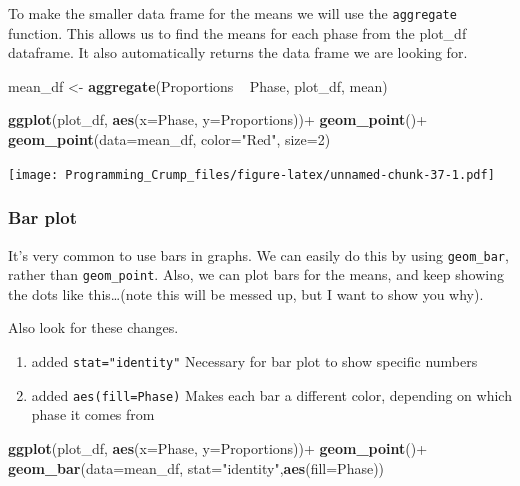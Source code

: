 \documentclass[]{book}
\newenvironment{Shaded}{\begin{snugshade}}{\end{snugshade}}
\newcommand{\KeywordTok}[1]{\textcolor[rgb]{0.13,0.29,0.53}{\textbf{{#1}}}}
\newcommand{\DataTypeTok}[1]{\textcolor[rgb]{0.13,0.29,0.53}{{#1}}}
\newcommand{\DecValTok}[1]{\textcolor[rgb]{0.00,0.00,0.81}{{#1}}}
\newcommand{\StringTok}[1]{\textcolor[rgb]{0.31,0.60,0.02}{{#1}}}
\newcommand{\NormalTok}[1]{{#1}}
\providecommand{\tightlist}{%
  \setlength{\itemsep}{0pt}\setlength{\parskip}{0pt}}
\theoremstyle{definition}
\theoremstyle{definition}
\theoremstyle{definition}
\theoremstyle{remark}
\begin{document}
To make the smaller data frame for the means we will use the
\texttt{aggregate} function. This allows us to find the means for each
phase from the plot\_df dataframe. It also automatically returns the
data frame we are looking for.

\begin{Shaded}
\begin{Highlighting}[]
\NormalTok{mean_df <-}\StringTok{ }\KeywordTok{aggregate}\NormalTok{(Proportions ~}\StringTok{ }\NormalTok{Phase, plot_df, mean)}

\KeywordTok{ggplot}\NormalTok{(plot_df, }\KeywordTok{aes}\NormalTok{(}\DataTypeTok{x=}\NormalTok{Phase, }\DataTypeTok{y=}\NormalTok{Proportions))+}\StringTok{ }
\StringTok{  }\KeywordTok{geom_point}\NormalTok{()+}
\StringTok{  }\KeywordTok{geom_point}\NormalTok{(}\DataTypeTok{data=}\NormalTok{mean_df, }\DataTypeTok{color=}\StringTok{"Red"}\NormalTok{, }\DataTypeTok{size=}\DecValTok{2}\NormalTok{)}
\end{Highlighting}
\end{Shaded}

\texttt{[image: Programming\_Crump\_files/figure-latex/unnamed-chunk-37-1.pdf]}

\subsubsection{Bar plot}\label{bar-plot}

It's very common to use bars in graphs. We can easily do this by using
\texttt{geom\_bar}, rather than \texttt{geom\_point}. Also, we can plot
bars for the means, and keep showing the dots like this\ldots{}(note
this will be messed up, but I want to show you why).

Also look for these changes.

\begin{enumerate}
\def\labelenumi{\arabic{enumi}.}
\tightlist
\item
  added \texttt{stat="identity"} Necessary for bar plot to show specific
  numbers
\item
  added \texttt{aes(fill=Phase)} Makes each bar a different color,
  depending on which phase it comes from
\end{enumerate}

\begin{Shaded}
\begin{Highlighting}[]
\KeywordTok{ggplot}\NormalTok{(plot_df, }\KeywordTok{aes}\NormalTok{(}\DataTypeTok{x=}\NormalTok{Phase, }\DataTypeTok{y=}\NormalTok{Proportions))+}\StringTok{ }
\StringTok{  }\KeywordTok{geom_point}\NormalTok{()+}
\StringTok{  }\KeywordTok{geom_bar}\NormalTok{(}\DataTypeTok{data=}\NormalTok{mean_df, }\DataTypeTok{stat=}\StringTok{"identity"}\NormalTok{,}\KeywordTok{aes}\NormalTok{(}\DataTypeTok{fill=}\NormalTok{Phase))}
\end{Highlighting}
\end{Shaded}
\end{document}
